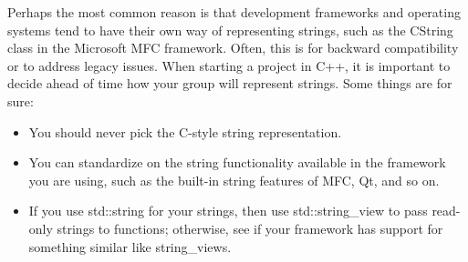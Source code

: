 Perhaps the most common reason is that development frameworks and operating systems tend to have their own way of representing strings, such as the CString class in the Microsoft MFC framework. Often, this is for backward compatibility or to address legacy issues. When starting a project in C++, it is important to decide ahead of time how your group will represent strings. Some things are for sure:

\begin{itemize}
\item
You should never pick the C-style string representation.

\item
You can standardize on the string functionality available in the framework you are using, such as the built-in string features of MFC, Qt, and so on.

\item
If you use std::string for your strings, then use std::string\_view to pass read-only strings to functions; otherwise, see if your framework has support for something similar like string\_views.
\end{itemize}




























